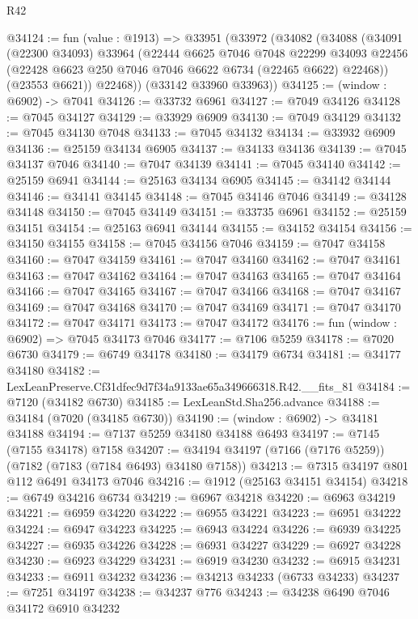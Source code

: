 \begin{lexlean}{R42}
\begin{coremodule}
{@34124 := fun (value : @1913) =>
  @33951
    (@33972
      (@34082
        (@34088
          (@34091
            (@22300 @34093)
            @33964
            (@22444
              @6625
              @7046
              @7048
              @22299
              @34093
              @22456
              (@22428 @6623 @250 @7046 @7046 @6622 @6734 (@22465 @6622) @22468))
            (@23553 @6621))
          @22468))
      (@33142 @33960 @33963))
@34125 := (window : @6902) -> @7041
@34126 := @33732 @6961
@34127 := @7049 @34126
@34128 := @7045 @34127
@34129 := @33929 @6909
@34130 := @7049 @34129
@34132 := @7045 @34130 @7048
@34133 := @7045 @34132
@34134 := @33932 @6909
@34136 := @25159 @34134 @6905
@34137 := @34133 @34136
@34139 := @7045 @34137 @7046
@34140 := @7047 @34139
@34141 := @7045 @34140
@34142 := @25159 @6941
@34144 := @25163 @34134 @6905
@34145 := @34142 @34144
@34146 := @34141 @34145
@34148 := @7045 @34146 @7046
@34149 := @34128 @34148
@34150 := @7045 @34149
@34151 := @33735 @6961
@34152 := @25159 @34151
@34154 := @25163 @6941 @34144
@34155 := @34152 @34154
@34156 := @34150 @34155
@34158 := @7045 @34156 @7046
@34159 := @7047 @34158
@34160 := @7047 @34159
@34161 := @7047 @34160
@34162 := @7047 @34161
@34163 := @7047 @34162
@34164 := @7047 @34163
@34165 := @7047 @34164
@34166 := @7047 @34165
@34167 := @7047 @34166
@34168 := @7047 @34167
@34169 := @7047 @34168
@34170 := @7047 @34169
@34171 := @7047 @34170
@34172 := @7047 @34171
@34173 := @7047 @34172
@34176 := fun (window : @6902) => @7045 @34173 @7046
@34177 := @7106 @5259
@34178 := @7020 @6730
@34179 := @6749 @34178
@34180 := @34179 @6734
@34181 := @34177 @34180
@34182 := LexLeanPreserve.Cf31dfec9d7f34a9133ae65a349666318.R42.__fits_81
@34184 := @7120 (@34182 @6730)
@34185 := LexLeanStd.Sha256.advance
@34188 := @34184 (@7020 (@34185 @6730))
@34190 := (window : @6902) -> @34181 @34188
@34194 := @7137 @5259 @34180 @34188 @6493
@34197 := @7145 (@7155 @34178) @7158
@34207 := @34194 @34197 (@7166 (@7176 @5259)) (@7182 (@7183 (@7184 @6493) @34180 @7158))
@34213 := @7315 @34197 @801 @112 @6491 @34173 @7046
@34216 := @1912 (@25163 @34151 @34154)
@34218 := @6749 @34216 @6734
@34219 := @6967 @34218
@34220 := @6963 @34219
@34221 := @6959 @34220
@34222 := @6955 @34221
@34223 := @6951 @34222
@34224 := @6947 @34223
@34225 := @6943 @34224
@34226 := @6939 @34225
@34227 := @6935 @34226
@34228 := @6931 @34227
@34229 := @6927 @34228
@34230 := @6923 @34229
@34231 := @6919 @34230
@34232 := @6915 @34231
@34233 := @6911 @34232
@34236 := @34213 @34233 (@6733 @34233)
@34237 := @7251 @34197
@34238 := @34237 @776
@34243 := @34238 @6490 @7046 @34172 @6910 @34232
}
\end{coremodule}
\end{lexlean}

